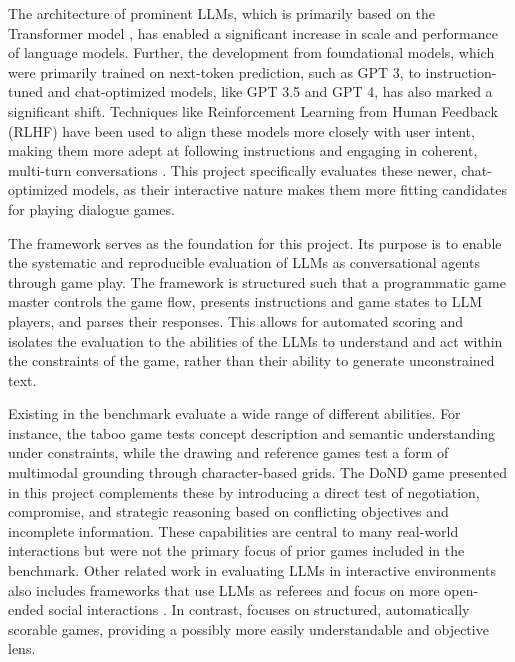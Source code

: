 The architecture of prominent LLMs, which is primarily based on the Transformer model \cite{vaswani2017attention}, has enabled a significant increase in scale and performance of language models. Further, the development from foundational models, which were primarily trained on next-token prediction, such as GPT 3, to instruction-tuned and chat-optimized models, like GPT 3.5 and GPT 4, has also marked a significant shift. Techniques like Reinforcement Learning from Human Feedback (RLHF) have been used to align these models more closely with user intent, making them more adept at following instructions and engaging in coherent, multi-turn conversations \cite{ouyang2022training}. This project specifically evaluates these newer, chat-optimized models, as their interactive nature makes them more fitting candidates for playing dialogue games.

The  framework \cite{chalamalasetti-etal-2023-clembench,beyer2024clembench} serves as the foundation for this project. Its purpose is to enable the systematic and reproducible evaluation of LLMs as conversational agents through game play. The framework is structured such that a programmatic game master controls the game flow, presents instructions and game states to LLM players, and parses their responses. This allows for automated scoring and isolates the evaluation to the abilities of the LLMs to understand and act within the constraints of the game, rather than their ability to generate unconstrained text.

Existing  in the benchmark evaluate a wide range of different abilities. For instance, the taboo game tests concept description and semantic understanding under constraints, while the drawing and reference games test a form of multimodal grounding through character-based grids. The DoND game presented in this project complements these by introducing a direct test of negotiation, compromise, and strategic reasoning based on conflicting objectives and incomplete information. These capabilities are central to many real-world interactions but were not the primary focus of prior games included in the benchmark. Other related work in evaluating LLMs in interactive environments also includes frameworks that use LLMs as referees and focus on more open-ended social interactions \cite{li2023beyond,zhou2024sotopia}. In contrast,  focuses on structured, automatically scorable games, providing a possibly more easily understandable and objective lens.

